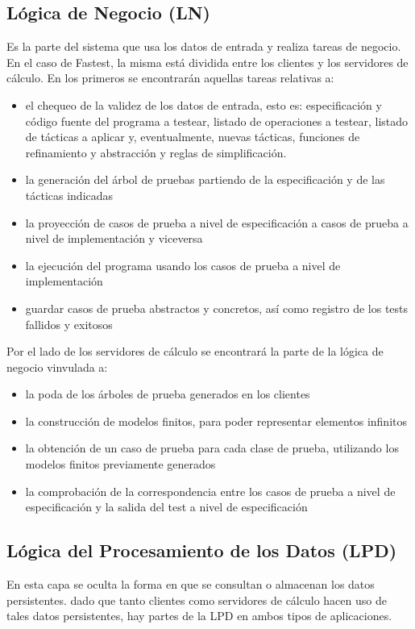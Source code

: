 \documentclass[a4paper,11pt]{article}
\begin{document}
\subsection{Lógica de Negocio (LN)}
Es la parte del sistema que usa los datos de entrada y realiza tareas de negocio. En el caso de Fastest, la misma está dividida entre los clientes y los servidores de cálculo. En los primeros se encontrarán aquellas tareas relativas a:
\begin{itemize}
\item el chequeo de la validez de los datos de entrada, esto es: especificación y código fuente del programa a testear, listado de operaciones a testear, listado de tácticas a aplicar y, eventualmente, nuevas tácticas, funciones de refinamiento y abstracción y reglas de simplificación.
\item la generación del árbol de pruebas partiendo de la especificación y de las tácticas indicadas
\item la proyección de casos de prueba a nivel de especificación a casos de prueba a nivel de implementación y viceversa
\item la ejecución del programa usando los casos de prueba a nivel de implementación
\item guardar casos de prueba abstractos y concretos, así como registro de los tests fallidos y exitosos
\end{itemize}
Por el lado de los servidores de cálculo se encontrará la parte de la lógica de negocio vinvulada a:
\begin{itemize}
 \item la poda de los árboles de prueba generados en los clientes
 \item la construcción de modelos finitos, para poder representar elementos infinitos
 \item la obtención de un caso de prueba para cada clase de prueba, utilizando los modelos finitos previamente generados
 \item la comprobación de la correspondencia entre los casos de prueba a nivel de especificación y la salida del test a nivel de especificación
\end{itemize}
\subsection{Lógica del Procesamiento de los Datos (LPD)}
En esta capa se oculta la forma en que se consultan o almacenan los datos persistentes. dado que tanto clientes como servidores de cálculo hacen uso de tales datos persistentes, hay partes de la LPD en ambos tipos de aplicaciones.
\end{document}
